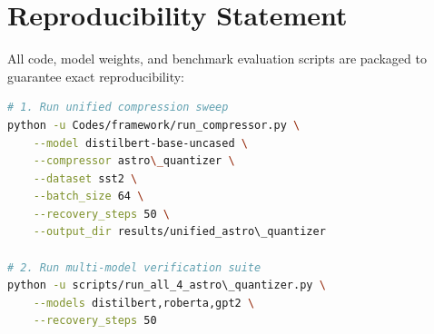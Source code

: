 \section{Reproducibility Statement}
All code, model weights, and benchmark evaluation scripts are packaged to guarantee exact reproducibility:
\begin{lstlisting}[language=bash]
# 1. Run unified compression sweep
python -u Codes/framework/run_compressor.py \
    --model distilbert-base-uncased \
    --compressor astro\_quantizer \
    --dataset sst2 \
    --batch_size 64 \
    --recovery_steps 50 \
    --output_dir results/unified_astro\_quantizer

# 2. Run multi-model verification suite
python -u scripts/run_all_4_astro\_quantizer.py \
    --models distilbert,roberta,gpt2 \
    --recovery_steps 50
\end{lstlisting}
